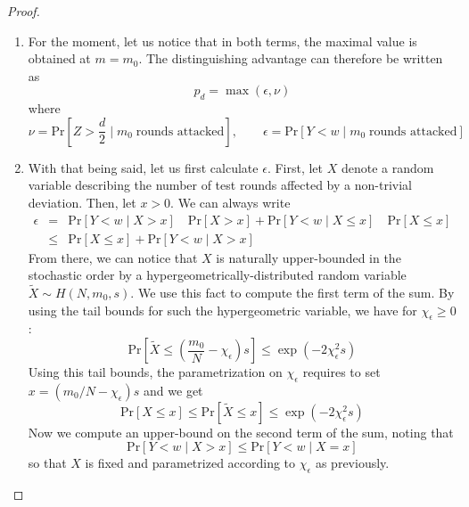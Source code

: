 \begin{proof}
\begin{enumerate}[label=\arabic*)]
    \item
    For the moment, let us notice that in both terms, the maximal value is obtained at $m=m_0$.
    The distinguishing advantage can therefore be written as
    \begin{equation}
        p_d = \max(\epsilon, \nu)
    \end{equation}
    where
    \begin{equation}
        \nu =
        \mathrm{Pr}\left[Z > \frac{d}{2} \;|\; m_0 \; \text{rounds attacked}\right]
        ,\qquad
        \epsilon =
        \mathrm{Pr} [Y<w\;|\; m_0 \; \text{rounds attacked}]
    \end{equation}
    \item With that being said, let us first calculate $\epsilon$.
    First, let $X$ denote a random variable describing the number of test rounds affected by a non-trivial deviation.
    Then, let $x>0$. We can always write
    \begin{eqnarray}
        \epsilon &=&
        \mathrm{Pr} [Y<w\;|\; X>x] \quad \mathrm{Pr}[X>x]
        +
        \mathrm{Pr} [Y<w\;|\; X\leq x] \quad \mathrm{Pr}[X\leq x]
        \\
        &\leq&
        \mathrm{Pr}[X\leq x]
        +
        \mathrm{Pr} [Y<w\;|\; X> x]
    \end{eqnarray}
    From there, we can notice that $X$ is naturally upper-bounded in the stochastic order by a hypergeometrically-distributed random variable $\tilde X \sim H(N, m_0, s)$.
    We use this fact to compute the first term of the sum.
    By using the tail bounds for such the hypergeometric variable, we have for $\chi_\epsilon\geq 0$:
    \begin{equation}
        \mathrm{Pr}\left[
            \tilde X \leq \left(
                \dfrac{m_0}{N} - \chi_\epsilon
             \right)s
         \right] \leq \exp(-2\chi_\epsilon^2 s)
    \end{equation}
    Using this tail bounds, the parametrization on $\chi_\epsilon$ requires to set $x = ({m_0}/{N} - \chi_\epsilon)s$ and we get
    \begin{equation}
        \mathrm{Pr}[X\leq x]
        \leq
        \mathrm{Pr}\left[
            \tilde X \leq x
         \right]
         \leq \exp(-2\chi_\epsilon^2 s)
    \end{equation}
    Now we compute an upper-bound on the second term of the sum, noting that $$\mathrm{Pr} [Y<w\;|\;  X> x] \leq \mathrm{Pr} [Y<w\;|\; X= x]$$ so that $X$ is fixed and parametrized according to $\chi_\epsilon$ as previously.

\end{enumerate}
\end{proof}

